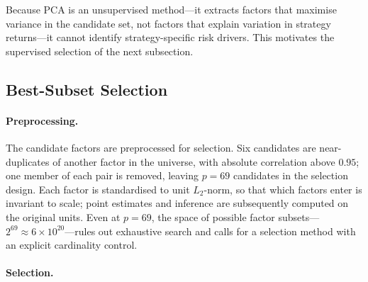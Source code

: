 Because PCA is an unsupervised method---it extracts factors that
maximise variance in the candidate set, not factors that explain
variation in strategy returns---it cannot identify strategy-specific
risk drivers. This motivates the supervised selection of the next
subsection.



\subsection{Best-Subset Selection}
\label{sec:aen}

\paragraph{Preprocessing.}

The candidate factors are preprocessed for selection. Six candidates
are near-duplicates of another factor in the universe, with absolute
correlation above $0.95$; one member of each pair is removed, leaving
$p = 69$ candidates in the selection design. Each factor is
standardised to unit $L_2$-norm, so that which factors enter is
invariant to scale; point estimates and inference are subsequently
computed on the original units. Even at $p = 69$, the space of
possible factor subsets---$2^{69} \approx 6 \times 10^{20}$---rules
out exhaustive search and calls for a selection method with an
explicit cardinality control.

\paragraph{Selection.}

